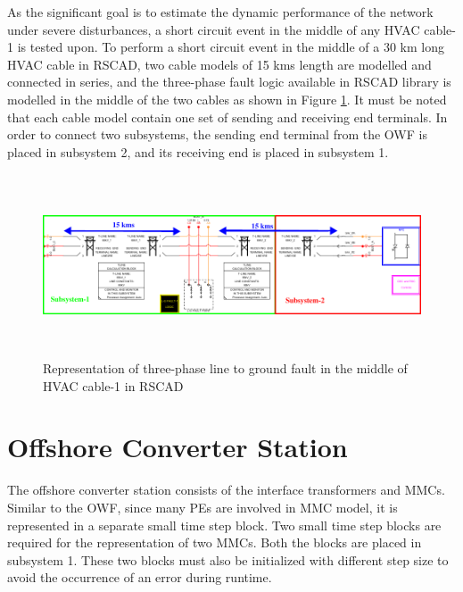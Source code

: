 As the significant goal is to estimate the dynamic performance of the network under severe disturbances, a short circuit event in the middle of any \gls{HVAC} cable-1 is tested upon. To perform a short circuit event in the middle of a 30 km long \gls{HVAC} cable in RSCAD, two cable models of 15 kms length are modelled and connected in series, and the three-phase fault logic available in RSCAD library is modelled in the middle of the two cables as shown in Figure \ref{fig:Subsystem_Trial}. It must be noted that each cable model contain one set of sending and receiving end terminals. In order to connect two subsystems, the sending end terminal from the \gls{OWF} is placed in subsystem 2, and its receiving end is placed in subsystem 1. %

\begin{figure}[H]
\centering
    \includegraphics[height = 5.4cm,width = 17cm]{Diagrams/Chapter_4/subsystem_fault_mark.pdf}
    \caption{Representation of three-phase line to ground fault in the middle of HVAC cable-1 in RSCAD}
    \label{fig:Subsystem_Trial}
\end{figure}

\section{Offshore Converter Station}
The offshore converter station consists of the interface transformers and \gls{MMC}s. Similar to the \gls{OWF}, since many \gls{PE}s are involved in \gls{MMC} model, it is represented in a separate small time step block. Two small time step blocks are required for the representation of two \gls{MMC}s. Both the blocks are placed in subsystem 1. These two blocks must also be initialized with different step size to avoid the occurrence of an error during runtime. 

